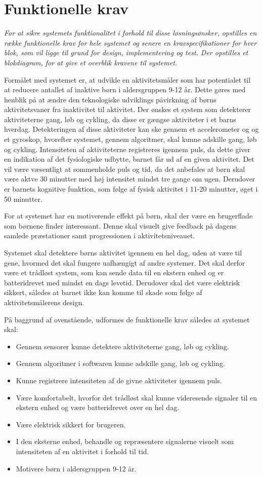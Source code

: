 \section{Funktionelle krav}\label{funktionellekrav}
\textit{For at sikre systemets funktionalitet i forhold til disse løsningsønsker, opstilles en række funktionelle krav for hele systemet og senere en kravspecifikationer for hver blok, som vil ligge til grund for design, implementering og test. Der opstilles et blokdiagram, for at give et overblik kravene til systemet.}

Formålet med systemet er, at udvikle en aktivitetsmåler som har potentialet til at reducere antallet af inaktive børn i aldersgruppen 9-12 år. Dette gøres med henblik på at ændre den teknologiske udviklings påvirkning af børns aktivitetsvaner fra inaktivitet til aktivitet.
Der ønskes et system som detekterer aktiviteterne gang, løb og cykling, da disse er gængse aktiviteter i et barns hverdag. Detekteringen af disse aktiviteter kan ske gennem et accelerometer og og et gyroskop, hvorefter systemet, gennem algoritmer, skal kunne adskille gang, løb og cykling.
Intensiteten af aktiviteterne registreres igennem puls, da dette giver en indikation af det fysiologiske udbytte, barnet får ud af en given aktivitet. Det vil være væsentligt at sommenholde puls og tid, da det anbefales at børn skal være aktve 30 minutter med høj intensitet mindst tre gange om ugen. Derudover er barnets kognitive funktion, som følge af fysisk aktivitet i 11-20 minutter, øget i 50 minutter.

For at systemet har en motiverende effekt på børn, skal der være en brugerflade som børnene finder interessant. Denne skal visuelt give feedback på dagens samlede præstationer samt progressionen i aktivitetsniveauet.

Systemet skal detektere børns aktivitet igennem en hel dag, uden at være til gene, hvormed det skal fungere uafhængigt af andre systemer. Det skal derfor være et trådløst system, som kan sende data til en ekstern enhed og er batteridrevet med mindst en dags levetid. Derudover skal det være elektrisk sikkert, således at barnet ikke kan komme til skade som følge af aktivitetsmålerens design. 

På baggrund af ovenstående, udformes de funktionelle krav således at systemet skal: 
\begin{itemize}
	\item Gennem sensorer kunne detektere aktiviteterne gang, løb og cykling.
	\item Gennem algoritmer i softwaren kunne adskille gang, løb og cykling.
	\item Kunne registrere intensiteten af de givne aktiviteter igennem puls.
	\item Være komfortabelt, hvorfor det trådløst skal kunne videresende signaler til en ekstern enhed og være batteridrevet over en hel dag.
	\item Være elektrisk sikkert for brugeren.
	\item I den eksterne enhed, behandle og repræsentere signalerne visuelt som intensiteten af en aktivitet i forhold til tid.
	\item Motivere børn i aldersgruppen 9-12 år. 
\end{itemize}

